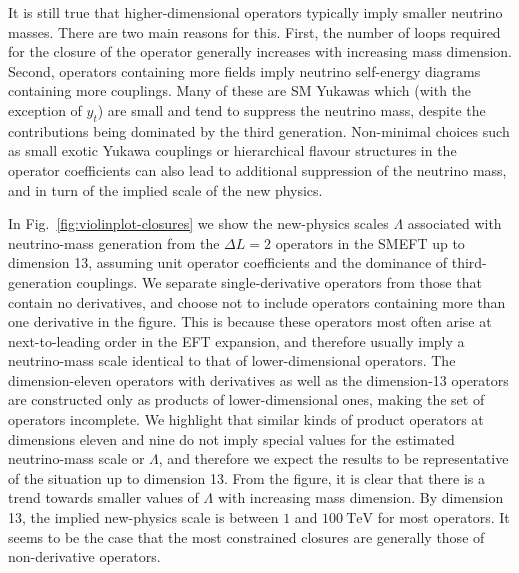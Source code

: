 It is still true that higher-dimensional operators typically imply smaller
neutrino masses. There are two main reasons for this. First, the number of loops
required for the closure of the operator generally increases with increasing
mass dimension. Second, operators containing more fields imply neutrino
self-energy diagrams containing more couplings. Many of these are SM Yukawas
which (with the exception of $y_{t}$) are small and tend to suppress the
neutrino mass, despite the contributions being dominated by the third
generation. Non-minimal choices such as small exotic Yukawa couplings or
hierarchical flavour structures in the operator coefficients can also lead to
additional suppression of the neutrino mass, and in turn of the implied scale of
the new physics.

In Fig.~\ref{fig:violinplot-closures} we show the new-physics scales $\Lambda$
associated with neutrino-mass generation from the $\Delta L = 2$ operators in
the SMEFT up to dimension 13, assuming unit operator coefficients and the
dominance of third-generation couplings. We separate single-derivative operators
from those that contain no derivatives, and choose not to include operators
containing more than one derivative in the figure. This is because these
operators most often arise at next-to-leading order in the EFT expansion, and
therefore usually imply a neutrino-mass scale identical to that of
lower-dimensional operators. The dimension-eleven operators with derivatives as
well as the dimension-13 operators are constructed only as products of
lower-dimensional ones, making the set of operators incomplete. We highlight
that similar kinds of product operators at dimensions eleven and nine do not
imply special values for the estimated neutrino-mass scale or $\Lambda$, and
therefore we expect the results to be representative of the situation up to
dimension 13. From the figure, it is clear that there is a trend towards smaller
values of $\Lambda$ with increasing mass dimension. By dimension 13, the implied
new-physics scale is between $1$ and $100~\text{TeV}$ for most operators. It
seems to be the case that the most constrained closures are generally those of
non-derivative operators.

